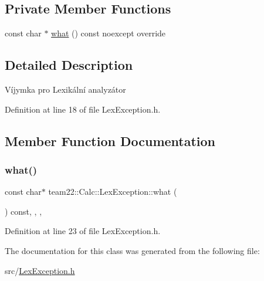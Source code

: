 \subsection*{Private Member Functions}
\begin{DoxyCompactItemize}
\item 
const char $\ast$ \hyperlink{classteam22_1_1_calc_1_1_lex_exception_afeba1f355eee4aacad8cb7409b1ee3ea}{what} () const noexcept override
\end{DoxyCompactItemize}


\subsection{Detailed Description}
Víjymka pro Lexikální analyzátor 

Definition at line 18 of file Lex\+Exception.\+h.



\subsection{Member Function Documentation}
\mbox{\label{classteam22_1_1_calc_1_1_lex_exception_afeba1f355eee4aacad8cb7409b1ee3ea}} 
\subsubsection{\texorpdfstring{what()}{what()}}
{\footnotesize\ttfamily const char$\ast$ team22\+::\+Calc\+::\+Lex\+Exception\+::what (\begin{DoxyParamCaption}{ }\end{DoxyParamCaption}) const\hspace{0.3cm}{\ttfamily [inline]}, {\ttfamily [override]}, {\ttfamily [private]}, {\ttfamily [noexcept]}}



Definition at line 23 of file Lex\+Exception.\+h.



The documentation for this class was generated from the following file\+:\begin{DoxyCompactItemize}
\item 
src/\hyperlink{_lex_exception_8h}{Lex\+Exception.\+h}\end{DoxyCompactItemize}
